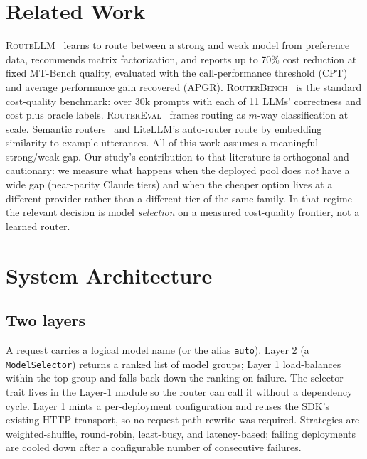 \documentclass[11pt]{article}
\newcommand{\rb}{\textsc{RouterBench}}
\newcommand{\rl}{\textsc{RouteLLM}}
\newcommand{\re}{\textsc{RouterEval}}
\newcommand{\code}[1]{\texttt{\small #1}}
\begin{document}
\section{Related Work}
\rl{}~\citep{routellm} learns to route between a strong and weak model from preference
data, recommends matrix factorization, and reports up to 70\% cost reduction at fixed
MT-Bench quality, evaluated with the call-performance threshold (CPT) and average
performance gain recovered (APGR). \rb{}~\citep{routerbench} is the standard cost-quality
benchmark: over 30k prompts with each of 11 LLMs' correctness and cost plus oracle
labels. \re{}~\citep{routereval} frames routing as $m$-way classification at scale.
Semantic routers~\citep{semanticrouter} and LiteLLM's auto-router route by embedding
similarity to example utterances. All of this work assumes a meaningful strong/weak gap.
Our study's contribution to that literature is orthogonal and cautionary: we measure what
happens when the deployed pool does \emph{not} have a wide gap (near-parity Claude tiers)
and when the cheaper option lives at a different provider rather than a different tier of
the same family. In that regime the relevant decision is model \emph{selection} on a
measured cost-quality frontier, not a learned router.

\section{System Architecture}
\subsection{Two layers}
A request carries a logical model name (or the alias \code{auto}). Layer 2 (a
\code{ModelSelector}) returns a ranked list of model groups; Layer 1 load-balances within
the top group and falls back down the ranking on failure. The selector trait lives in the
Layer-1 module so the router can call it without a dependency cycle. Layer 1 mints a
per-deployment configuration and reuses the SDK's existing HTTP transport, so no
request-path rewrite was required. Strategies are weighted-shuffle, round-robin,
least-busy, and latency-based; failing deployments are cooled down after a configurable
number of consecutive failures.
\end{document}
